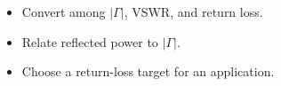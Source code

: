 \begin{objectives}
\begin{itemize}[leftmargin=1.4em,itemsep=2pt]
\item Convert among $|\Gamma|$, VSWR, and return loss.
\item Relate reflected power to $|\Gamma|$.
\item Choose a return-loss target for an application.
\end{itemize}
\end{objectives}
